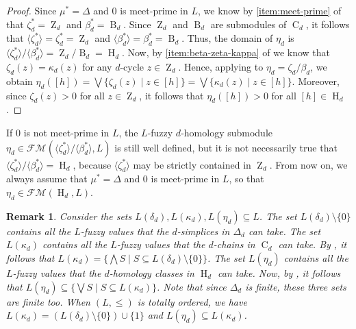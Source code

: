 \documentclass[a4paper,10pt]{article}
\newtheorem{remark}[theorem]{Remark}
\newcommand{\calfm}{\mathcal{F\!M}}
\DeclareMathOperator{\Co}{C}
\DeclareMathOperator{\Zo}{Z}
\DeclareMathOperator{\Bo}{B}
\DeclareMathOperator{\Ho}{H}
\begin{document}
\begin{proof}
Since \(\mu^* = \Delta\) and \(0\) is meet-prime in \(L\), we know by \cref{item:meet-prime} of  that \(\zeta_d^* = \Zo_d\) and \(\beta_d^* = \Bo_d\). Since \(\Zo_d\) and \(\Bo_d\) are submodules of \(\Co_d\), it follows that \(\langle \zeta_d^* \rangle = \zeta_d^*= \Zo_d\) and \(\langle \beta_d^* \rangle = \beta_d^*= \Bo_d\). Thus, the domain of \(\eta_d\) is \(\langle\zeta_d^*\rangle/\langle\beta_d^*\rangle= \Zo_d/\Bo_d=\Ho_d\). 
Now, by \cref{item:beta-zeta-kappa} of  we know that \(\zeta_d(z)=\kappa_d(z)\) for any \(d\)-cycle \(z \in \Zo_d\).
Hence, applying  to \(\eta_d = \zeta_d/\beta_d\), we obtain \(\eta_d([h]) = \bigvee \{ \zeta_d(z) \mid z \in [h] \} = \bigvee \{ \kappa_d(z) \mid z \in [h] \}\). Moreover, since \(\zeta_d(z)>0\) for all \(z \in \Zo_d\), it follows that \(\eta_d([h])>0\) for all \([h] \in \Ho_d\).
\end{proof}

If \(0\) is not meet-prime in \(L\), the \(L\)-fuzzy \(d\)-homology submodule \(\eta_d\in \calfm(\langle\zeta_d^*\rangle/\langle\beta^*_d\rangle,L)\) is still well defined, but it is not necessarily true that \(\langle\zeta_d^*\rangle/\langle\beta^*_d\rangle = \Ho_d\), because \(\langle \zeta_d^*\rangle\) may be strictly contained in \(\Zo_d\).
From now on, we always assume that \(\mu^*=\Delta\) and \(0\) is meet-prime in \(L\), so that \(\eta_d \in \calfm(\Ho_d,L)\).

\begin{remark}
\label{rem:Lsets}
Consider the sets \(L(\delta_d),L(\kappa_d),L(\eta_d)  \subseteq L\). 
The set \(L(\delta_d)\setminus\{0\}\) contains all the \(L\)-fuzzy values that the \(d\)-simplices in \(\Delta_d\) can take. 
The set \(L(\kappa_d)\) contains all the \(L\)-fuzzy values that the \(d\)-chains in \(\Co_d\) can take. 
By , it follows that \(L(\kappa_d) = \{\bigwedge S \mid S \subseteq L(\delta_d)\setminus \{0\}\}\).
The set \(L(\eta_d)\) contains all the \(L\)-fuzzy values that the \(d\)-homology classes in \(\Ho_d\) can take. 
Now, by , it follows that \(L(\eta_d) \subseteq \{\bigvee S \mid S \subseteq L(\kappa_d)\}\).
Note that since \(\Delta_d\) is finite, these three sets are finite too.
When \((L,\leq)\) is totally ordered, we have \(L(\kappa_d) = (L(\delta_d)\setminus\{0\})\cup \{1\}\) and \(L(\eta_d) \subseteq L(\kappa_d)\).
\end{remark}
\end{document}
